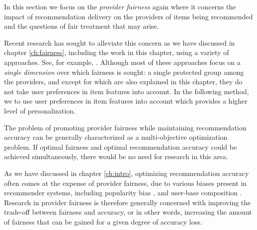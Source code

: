 \label{sec:ofair}


In this section we focus on the \textit{provider fairness} again where it concerns the impact of recommendation delivery on the providers of items being recommended and the questions of fair treatment that may arise\cite{burke2017multisided}.

Recent research has sought to alleviate this concern as we have discussed in chapter \ref{ch:fairness}, including the work in this chapter, using a variety of approaches. See, for example, \cite{yao2017beyond,burke2018balanced,ekstrand2018exploring,liu2019personalized,kamishima2016model,beutel2019fairness}. Although most of these approaches focus on a \emph{single dimension} over which fairness is sought: a single protected group among the providers, and except for \cite{liu2019personalized,sonboli2020opportunistic} which are also explained in this chapter, they do not take user preferences in item features into account. In the following method, we to use user preferences in item features into account which provides a higher level of personalization.

The problem of promoting provider fairness while maintaining recommendation accuracy can be generally characterized as a multi-objective optimization problem. If optimal fairness and optimal recommendation accuracy could be achieved simultaneously, there would be no need for research in this area. 

As we have discussed in chapter \ref{ch:intro}, optimizing recommendation accuracy often comes at the expense of provider fairness, due to various biases present in recommender systems, including popularity bias \cite{celma2008hits,lee2014fairness}, and user-base composition \cite{lin2019crank, yao2017beyond}. Research in provider fairness is therefore generally concerned with improving the trade-off between fairness and accuracy, or in other words, increasing the amount of fairness that can be gained for a given degree of accuracy loss.


